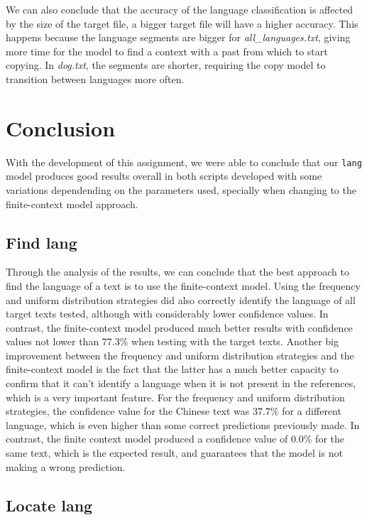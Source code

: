 \documentclass{article}
\begin{document}
We can also conclude that the accuracy of the language classification is affected by the size of the target file, 
a bigger target file will have a higher accuracy.
This happens because the language segments are bigger for \textit{all_languages.txt}, giving more time for the model to find a context with a past from which to start copying.
In \textit{dog.txt}, the segments are shorter, requiring the copy model to transition between languages more often.

\section{Conclusion}
\label{sec:conclusion}

With the development of this assignment, we were able to conclude that our \texttt{lang} model
produces good results overall in both scripts developed with some variations dependending on the
parameters used, specially when changing to the finite-context model approach.

\subsection{Find lang}
\label{subsec:conclusion:find_lang}

Through the analysis of the results, we can conclude that the best approach to find the language of a text is to use the finite-context model.
Using the frequency and uniform distribution strategies did also correctly identify the language of all target texts tested, although with considerably lower confidence values.
In contrast, the finite-context model produced much better results with confidence values not lower than $77.3\%$ when testing with the target texts.
Another big improvement between the frequency and uniform distribution strategies and the finite-context model is the fact that the latter has a much better capacity to confirm
that it can't identify a language when it is not present in the references, which is a very important feature. For the frequency and uniform distribution strategies, the confidence
value for the Chinese text was $37.7\%$ for a different language, which is even higher than some correct predictions previously made. In contrast, the finite context model produced a
confidence value of $0.0\%$ for the same text, which is the expected result, and guarantees that the model is not making a wrong prediction.

\subsection{Locate lang}
\label{subsec:conclusion:locate_lang}
\end{document}
